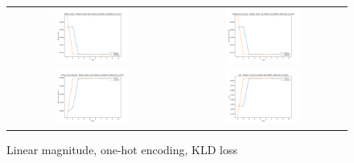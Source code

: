 \begin{appendices}
        \begin{figure}[H]
            \centering
            \begin{tabular}{cc}
                \includegraphics[width=0.45\textwidth]{figures/training_plots/ModelC-(linear_2D)-OneHot-KLD-ADAM_13-04-2019_21-26-52_AON-accuracy.pdf} & \includegraphics[width=0.45\textwidth]{figures/training_plots/ModelC-(linear_2D)-OneHot-KLD-ADAM_13-04-2019_21-26-52_categorical-accuracy.pdf} \\
                \includegraphics[width=0.45\textwidth]{figures/training_plots/ModelC-(linear_2D)-OneHot-KLD-ADAM_13-04-2019_21-26-52_binary-cross-entropy.pdf} & \includegraphics[width=0.45\textwidth]{figures/training_plots/ModelC-(linear_2D)-OneHot-KLD-ADAM_13-04-2019_21-26-52_loss.pdf}
            \end{tabular}
            \caption*{Linear magnitude, one-hot encoding, KLD loss}
        \end{figure}
        

\end{appendices}
